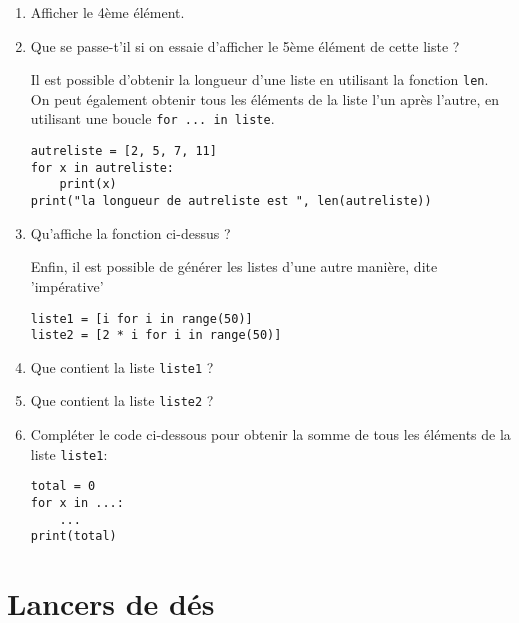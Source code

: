 \documentclass[
	classe=$2^{de}$,
	headerTitle=Python
]{informatique}
\begin{document}
\begin{enumerate}
	\item Afficher le 4ème élément.
	\item Que se passe-t'il si on essaie d'afficher le 5ème élément de cette liste ?

	      Il est possible d'obtenir la longueur d'une liste en utilisant la fonction \texttt{len}. On peut également obtenir tous les éléments de la liste l'un après l'autre, en utilisant une boucle \texttt{for ... in liste}.

	      \begin{lstlisting}
autreliste = [2, 5, 7, 11]
for x in autreliste:
    print(x)
print("la longueur de autreliste est ", len(autreliste))
\end{lstlisting}

	\item Qu'affiche la fonction ci-dessus ?

	      Enfin, il est possible de générer les listes d'une autre manière, dite 'impérative'

	      \begin{lstlisting}
liste1 = [i for i in range(50)]
liste2 = [2 * i for i in range(50)]
\end{lstlisting}

	\item Que contient la liste \texttt{liste1} ?
	\item Que contient la liste \texttt{liste2} ?
	\item Compléter le code ci-dessous pour obtenir la somme de tous les éléments de la liste \texttt{liste1}:

	      \begin{lstlisting}
total = 0
for x in ...:
    ...
print(total)
\end{lstlisting}
\end{enumerate}

\newpage

\section{Lancers de dés}

\end{document}
